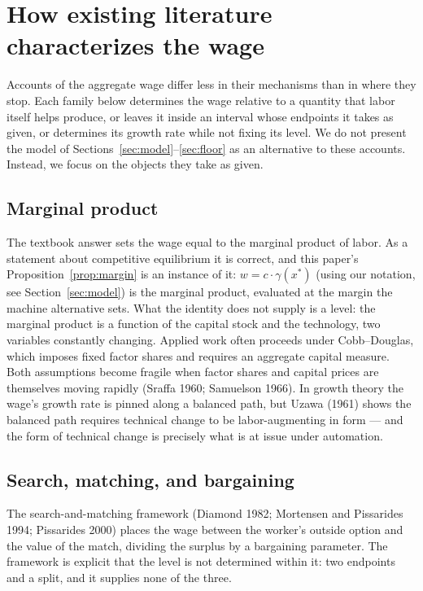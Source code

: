 \documentclass[12pt]{article}
\theoremstyle{plain}
\begin{document}
\section{How existing literature characterizes the wage}\label{sec:accounts}

Accounts of the aggregate wage differ less in their mechanisms than in where they stop. Each family below determines the wage relative to a quantity that labor itself helps produce, or leaves it inside an interval whose endpoints it takes as given, or determines its growth rate while not fixing its level. We do not present the model of Sections~\ref{sec:model}--\ref{sec:floor} as an alternative to these accounts. Instead, we focus on the objects they take as given.

\subsection{Marginal product}\label{sec:marginal-product}

The textbook answer sets the wage equal to the marginal product of labor. As a statement about competitive equilibrium it is correct, and this paper's Proposition~\ref{prop:margin} is an instance of it: $w = c\cdot \gamma (x^*)$ (using our notation, see Section~\ref{sec:model}) is the marginal product, evaluated at the margin the machine alternative sets. What the identity does not supply is a level: the marginal product is a function of the capital stock and the technology, two variables constantly changing. Applied work often proceeds under Cobb--Douglas, which imposes fixed factor shares and requires an aggregate capital measure. Both assumptions become fragile when factor shares and capital prices are themselves moving rapidly (Sraffa 1960; Samuelson 1966). In growth theory the wage's growth rate is pinned along a balanced path, but Uzawa (1961) shows the balanced path requires technical change to be labor-augmenting in form --- and the form of technical change is precisely what is at issue under automation.

\subsection{Search, matching, and bargaining}\label{sec:search}

The search-and-matching framework (Diamond 1982; Mortensen and Pissarides 1994; Pissarides 2000) places the wage between the worker's outside option and the value of the match, dividing the surplus by a bargaining parameter. The framework is explicit that the level is not determined within it: two endpoints and a split, and it supplies none of the three.
\end{document}
